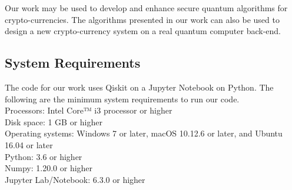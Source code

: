 Our work may be used to develop and enhance secure quantum algorithms for crypto-currencies. The algorithms presented in our work can also be used to design a new crypto-currency system on a real quantum computer back-end.
\subsection{System Requirements}
The code for our work uses Qiskit on a Jupyter Notebook on Python. The following are the minimum system requirements to run our code.\\
Processors: Intel Core™ i3 processor or higher\\
Disk space: 1 GB or higher\\
Operating systems: Windows 7 or later, macOS 10.12.6 or later, and Ubuntu 16.04 or later\\
Python: 3.6 or higher\\
Numpy: 1.20.0 or higher\\
Jupyter Lab/Notebook: 6.3.0 or higher\\
